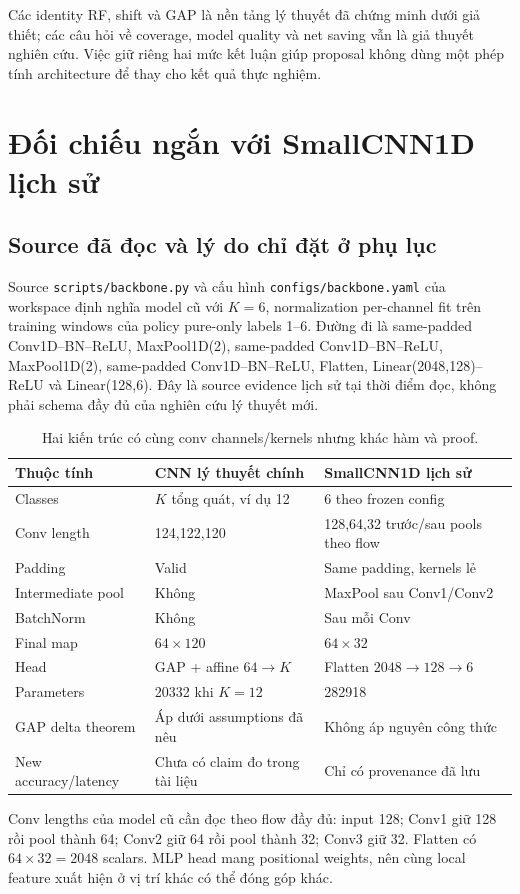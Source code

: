 \documentclass[11pt,a4paper]{article}
\newcommand{\code}[1]{{\small\ttfamily\nolinkurl{#1}}}
\theoremstyle{definition}
\begin{document}
Các identity RF, shift và GAP là nền tảng lý thuyết đã chứng minh dưới
giả thiết; các câu hỏi về coverage, model quality và net saving vẫn là
giả thuyết nghiên cứu. Việc giữ riêng hai mức kết luận giúp proposal
không dùng một phép tính architecture để thay cho kết quả thực nghiệm.

\appendix
\section{Đối chiếu ngắn với SmallCNN1D lịch sử}
\label{app:historical}
\subsection{Source đã đọc và lý do chỉ đặt ở phụ lục}
Source \code{scripts/backbone.py} và cấu hình
\code{configs/backbone.yaml} của workspace định nghĩa model cũ với
$K=6$, normalization per-channel fit trên training windows của policy
pure-only labels 1--6. Đường đi là same-padded Conv1D--BN--ReLU,
MaxPool1D(2), same-padded Conv1D--BN--ReLU, MaxPool1D(2),
same-padded Conv1D--BN--ReLU, Flatten, Linear(2048,128)--ReLU và
Linear(128,6). Đây là source evidence lịch sử tại thời điểm đọc, không
phải schema đầy đủ của nghiên cứu lý thuyết mới.

\begin{table}[!htbp]\centering\small
\caption{Hai kiến trúc có cùng conv channels/kernels nhưng khác hàm và proof.}
\begin{tabularx}{\linewidth}{@{}P{3cm}YY@{}}\toprule
Thuộc tính & CNN lý thuyết chính & SmallCNN1D lịch sử\\\midrule
Classes & $K$ tổng quát, ví dụ 12 &6 theo frozen config\\
Conv length &124,122,120&128,64,32 trước/sau pools theo flow\\
Padding &Valid &Same padding, kernels lẻ\\
Intermediate pool &Không &MaxPool sau Conv1/Conv2\\
BatchNorm &Không &Sau mỗi Conv\\
Final map & $64\times120$ & $64\times32$\\
Head &GAP + affine $64\to K$ &Flatten $2048\to128\to6$\\
Parameters &20332 khi $K=12$ &282918\\
GAP delta theorem &Áp dưới assumptions đã nêu &Không áp nguyên công thức\\
New accuracy/latency &Chưa có claim đo trong tài liệu &Chỉ có provenance đã lưu\\\bottomrule
\end{tabularx}
\end{table}
Conv lengths của model cũ cần đọc theo flow đầy đủ: input 128; Conv1
giữ 128 rồi pool thành 64; Conv2 giữ 64 rồi pool thành 32; Conv3 giữ 32.
Flatten có $64\times32=2048$ scalars. MLP head mang positional weights,
nên cùng local feature xuất hiện ở vị trí khác có thể đóng góp khác.
\end{document}
